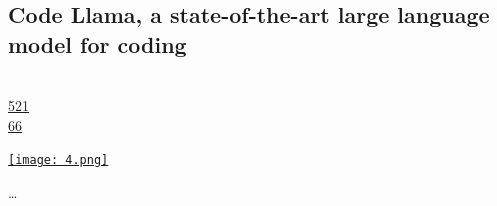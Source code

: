\documentclass[10pt,a4paper]{article}
\begin{document}
\subsection{Code Llama, a state-of-the-art large language model for coding}
\noindent\begin{minipage}[t]{0.19\linewidth}
\vspace{0pt}
\noindent\scshape\footnotesize
\\ {\scriptsize\faThumbsOUp}\space 
\href{http://news.ycombinator.com/item?id=37248494\&utm\_term=comment}{521} 
\\ {\scriptsize\faComments}\space 
\href{http://news.ycombinator.com/item?id=37248494\&utm\_term=comment}{66} 
\end{minipage} 
\begin{minipage}[t]{0.80\linewidth}
\vspace{0pt}
\begin{multicols}{2}
    \href{https://ai.meta.com/blog/code-llama-large-language-model-coding/?utm\_source=hackernewsletter\&utm\_medium=email\&utm\_term=fav}{
        \texttt{[image: 4.png]}
    }

\dots
\end{multicols}
\end{minipage}
\par\medskip
\end{document}
